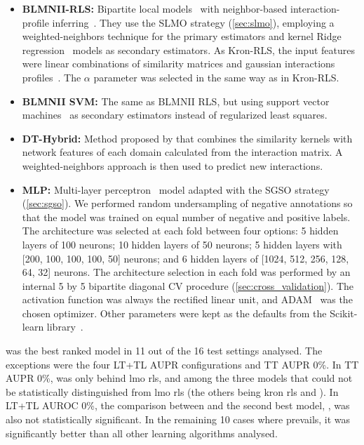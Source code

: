 \begin{itemize}
    \item \textbf{BLMNII-RLS:} Bipartite local models~\cite{yamanishi2008prediction,bleakley2009supervised} with neighbor-based interaction-profile inferring~\cite{mei2013drug}. They use the SLMO strategy (\autoref{sec:slmo}), employing a weighted-neighbors technique 
    for the primary estimators and kernel Ridge regression~\cite[p.~492-493]{murphy2012machine} models as secondary estimators.
    As Kron-RLS, the input features were linear combinations of similarity matrices and gaussian interactions profiles~\cite{vanlaarhoven2011gaussian}. The $\alpha$ parameter was selected in the same way as in Kron-RLS.

    \item \textbf{BLMNII SVM:} The same as BLMNII RLS, but using support vector machines~\cite{crammer2001algorithmic} as secondary estimators instead of regularized least squares.

    \item \textbf{DT-Hybrid:} Method proposed by  that combines the similarity kernels with network features of each domain calculated from the interaction matrix. A weighted-neighbors approach is then used to predict new interactions.  %

    \item \textbf{MLP:} Multi-layer perceptron~\cite{hastie2001elements} %
    model adapted with the SGSO strategy (\autoref{sec:sgso}). We performed random undersampling of negative annotations so that the model was trained on equal number of negative and positive labels. 
    The architecture was selected at each fold between four options: 5 hidden layers of 100 neurons; 10 hidden layers of 50 neurons; 5 hidden layers with [200, 100, 100, 100, 50] neurons; and 6 hidden layers of [1024, 512, 256, 128, 64, 32] neurons. The architecture selection in each fold was performed by an internal 5 by 5 bipartite diagonal CV procedure (\autoref{sec:cross_validation}).
    The activation function was always the rectified linear unit, and ADAM~\cite{kingma2017adam} was the chosen optimizer. Other parameters were kept as the defaults from the Scikit-learn library~\cite{pedregosa2011scikitlearn}.
\end{itemize}

 was the best ranked model in 11 out of the 16 test settings analysed. The exceptions were the four LT+TL AUPR configurations and TT AUPR 0\%. In TT AUPR 0\%,  was only behind lmo rls, and among the three models that could not be statistically distinguished from lmo rls (the others being kron rls and ). In LT+TL AUROC 0\%, the comparison between  and the second best model, , was also not statistically significant. In the remaining 10 cases where  prevails, it was significantly better than all other learning algorithms analysed.

